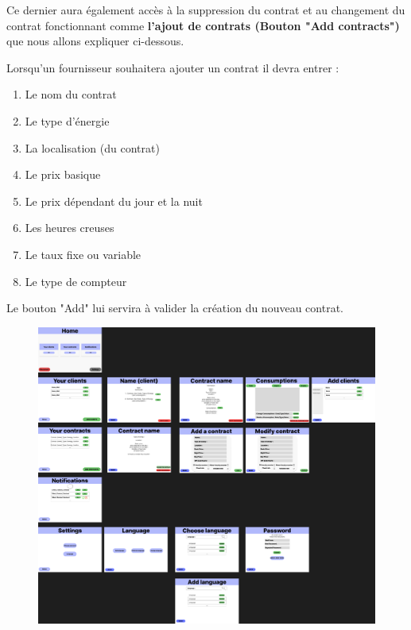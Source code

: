 \begin{flushleft}
Ce dernier aura également accès à la suppression du contrat et au changement du contrat fonctionnant comme \textbf{l'ajout de contrats (Bouton "Add contracts")} que nous allons expliquer ci-dessous.
\end{flushleft}

\begin{flushleft}
Lorsqu'un fournisseur souhaitera ajouter un contrat il devra entrer :
\end{flushleft}
\begin{enumerate}
\item Le nom du contrat
\item Le type d'énergie
\item La localisation (du contrat)
\item Le prix basique
\item Le prix dépendant du jour et la nuit
\item Les heures creuses
\item Le taux fixe ou variable
\item Le type de compteur
\end{enumerate}

\begin{flushleft}
Le bouton "Add" lui servira à valider la création du nouveau contrat.
\end{flushleft}

\begin{figure}
\centering
\includegraphics[width = 1\textwidth]{Base/interface/img/Supplier.png}
\end{figure}

